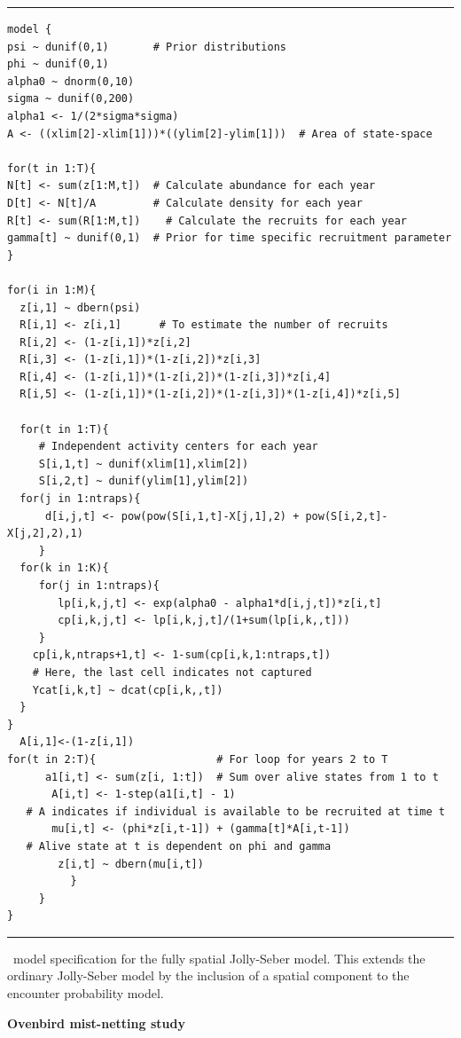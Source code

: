 \begin{panel}[htp]
\centering
\rule[0.1in]{\textwidth}{.03in}
{\small
\begin{verbatim}
model {
psi ~ dunif(0,1)       # Prior distributions
phi ~ dunif(0,1)
alpha0 ~ dnorm(0,10)
sigma ~ dunif(0,200)
alpha1 <- 1/(2*sigma*sigma)
A <- ((xlim[2]-xlim[1]))*((ylim[2]-ylim[1]))  # Area of state-space

for(t in 1:T){
N[t] <- sum(z[1:M,t])  # Calculate abundance for each year
D[t] <- N[t]/A	       # Calculate density for each year
R[t] <- sum(R[1:M,t])    # Calculate the recruits for each year
gamma[t] ~ dunif(0,1)  # Prior for time specific recruitment parameter
}

for(i in 1:M){
  z[i,1] ~ dbern(psi)
  R[i,1] <- z[i,1]      # To estimate the number of recruits
  R[i,2] <- (1-z[i,1])*z[i,2]
  R[i,3] <- (1-z[i,1])*(1-z[i,2])*z[i,3]
  R[i,4] <- (1-z[i,1])*(1-z[i,2])*(1-z[i,3])*z[i,4]
  R[i,5] <- (1-z[i,1])*(1-z[i,2])*(1-z[i,3])*(1-z[i,4])*z[i,5]

  for(t in 1:T){
     # Independent activity centers for each year
     S[i,1,t] ~ dunif(xlim[1],xlim[2]) 
     S[i,2,t] ~ dunif(ylim[1],ylim[2])
  for(j in 1:ntraps){
      d[i,j,t] <- pow(pow(S[i,1,t]-X[j,1],2) + pow(S[i,2,t]-X[j,2],2),1)
     }
  for(k in 1:K){
     for(j in 1:ntraps){
        lp[i,k,j,t] <- exp(alpha0 - alpha1*d[i,j,t])*z[i,t]
        cp[i,k,j,t] <- lp[i,k,j,t]/(1+sum(lp[i,k,,t]))
     }
    cp[i,k,ntraps+1,t] <- 1-sum(cp[i,k,1:ntraps,t]) 
    # Here, the last cell indicates not captured
    Ycat[i,k,t] ~ dcat(cp[i,k,,t])
  }
}
  A[i,1]<-(1-z[i,1])
for(t in 2:T){                   # For loop for years 2 to T
      a1[i,t] <- sum(z[i, 1:t])  # Sum over alive states from 1 to t
       A[i,t] <- 1-step(a1[i,t] - 1)   
   # A indicates if individual is available to be recruited at time t
       mu[i,t] <- (phi*z[i,t-1]) + (gamma[t]*A[i,t-1])
   # Alive state at t is dependent on phi and gamma
        z[i,t] ~ dbern(mu[i,t])
          }
     }
}
\end{verbatim}
}
\rule[-0.1in]{\textwidth}{.03in}
\caption{
\jags~model specification for the fully spatial Jolly-Seber
model. This extends the ordinary Jolly-Seber model by the inclusion of
a spatial component to the encounter probability model. }
\label{open.panel.spatialJS}
\end{panel}


{\flushleft \bf Ovenbird mist-netting study}

